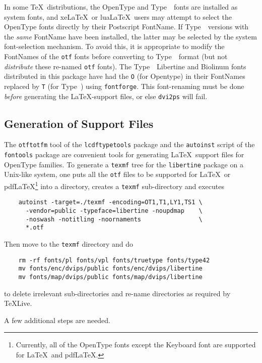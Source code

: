 \documentclass[11pt]{article}
\newcommand{\typeone}{Type~\liningnums{1}}
\begin{document}
In some \TeX\ distributions, the OpenType and \typeone\ fonts are installed as system fonts,
and xe\LaTeX\ or lua\LaTeX\ users may attempt to select the OpenType fonts directly by
their Postscript FontName.  If \typeone\ versions with the \emph{same} FontName
have been installed, the latter may be selected by the system font-selection
mechanism.  To avoid this, it is appropriate to modify the
FontNames of the \texttt{otf} fonts before converting to \typeone\
format (but not \emph{distribute} these re-named \texttt{otf} fonts).
The \typeone\  Libertine and Biolinum fonts distributed in this
package have had the \texttt{O} (for Opentype) in their FontNames replaced by
\texttt{T}
(for Type~) using \texttt{fontforge}.  This font-renaming
must be done \emph{before} generating the \LaTeX-support files, or else
\texttt{dvi2ps} will fail.


\subsection{Generation of Support Files}

The \texttt{otftotfm} tool of the \texttt{lcdftypetools}
package and the \texttt{autoinst} script of the \texttt{fontools} package are convenient tools
for generating \LaTeX\ support files for OpenType families.
To generate a \texttt{texmf} tree for the \texttt{libertine}
package on a Unix-like system, one puts all the \texttt{otf} files to be supported for \LaTeX\ or
pdf\LaTeX\footnote{Currently, all of the OpenType fonts except the Keyboard font are supported
for \LaTeX\ and pdf\LaTeX.} into a directory, creates a \texttt{texmf} sub-directory  and executes
\begin{verbatim}
    autoinst -target=./texmf -encoding=OT1,T1,LY1,TS1 \
      -vendor=public -typeface=libertine -noupdmap    \
      -noswash -notitling -noornaments                \
      *.otf
\end{verbatim}
Then move to the \texttt{texmf} directory and do
\begin{verbatim}
    rm -rf fonts/pl fonts/vpl fonts/truetype fonts/type42
    mv fonts/enc/dvips/public fonts/enc/dvips/libertine
    mv fonts/map/dvips/public fonts/map/dvips/libertine
\end{verbatim}
to delete irrelevant sub-directories and re-name directories as required by
TeXLive.

A few additional steps are needed.
\end{document}
